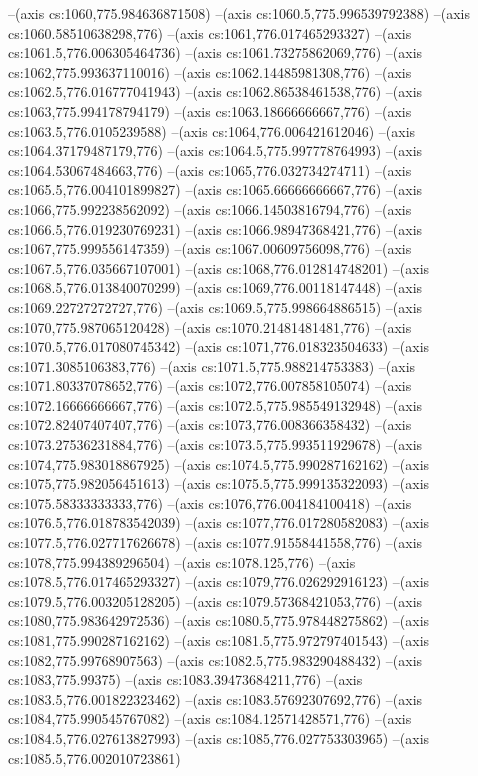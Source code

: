 --(axis cs:1060,775.984636871508)
--(axis cs:1060.5,775.996539792388)
--(axis cs:1060.58510638298,776)
--(axis cs:1061,776.017465293327)
--(axis cs:1061.5,776.006305464736)
--(axis cs:1061.73275862069,776)
--(axis cs:1062,775.993637110016)
--(axis cs:1062.14485981308,776)
--(axis cs:1062.5,776.016777041943)
--(axis cs:1062.86538461538,776)
--(axis cs:1063,775.994178794179)
--(axis cs:1063.18666666667,776)
--(axis cs:1063.5,776.0105239588)
--(axis cs:1064,776.006421612046)
--(axis cs:1064.37179487179,776)
--(axis cs:1064.5,775.997778764993)
--(axis cs:1064.53067484663,776)
--(axis cs:1065,776.032734274711)
--(axis cs:1065.5,776.004101899827)
--(axis cs:1065.66666666667,776)
--(axis cs:1066,775.992238562092)
--(axis cs:1066.14503816794,776)
--(axis cs:1066.5,776.019230769231)
--(axis cs:1066.98947368421,776)
--(axis cs:1067,775.999556147359)
--(axis cs:1067.00609756098,776)
--(axis cs:1067.5,776.035667107001)
--(axis cs:1068,776.012814748201)
--(axis cs:1068.5,776.013840070299)
--(axis cs:1069,776.00118147448)
--(axis cs:1069.22727272727,776)
--(axis cs:1069.5,775.998664886515)
--(axis cs:1070,775.987065120428)
--(axis cs:1070.21481481481,776)
--(axis cs:1070.5,776.017080745342)
--(axis cs:1071,776.018323504633)
--(axis cs:1071.3085106383,776)
--(axis cs:1071.5,775.988214753383)
--(axis cs:1071.80337078652,776)
--(axis cs:1072,776.007858105074)
--(axis cs:1072.16666666667,776)
--(axis cs:1072.5,775.985549132948)
--(axis cs:1072.82407407407,776)
--(axis cs:1073,776.008366358432)
--(axis cs:1073.27536231884,776)
--(axis cs:1073.5,775.993511929678)
--(axis cs:1074,775.983018867925)
--(axis cs:1074.5,775.990287162162)
--(axis cs:1075,775.982056451613)
--(axis cs:1075.5,775.999135322093)
--(axis cs:1075.58333333333,776)
--(axis cs:1076,776.004184100418)
--(axis cs:1076.5,776.018783542039)
--(axis cs:1077,776.017280582083)
--(axis cs:1077.5,776.027717626678)
--(axis cs:1077.91558441558,776)
--(axis cs:1078,775.994389296504)
--(axis cs:1078.125,776)
--(axis cs:1078.5,776.017465293327)
--(axis cs:1079,776.026292916123)
--(axis cs:1079.5,776.003205128205)
--(axis cs:1079.57368421053,776)
--(axis cs:1080,775.983642972536)
--(axis cs:1080.5,775.978448275862)
--(axis cs:1081,775.990287162162)
--(axis cs:1081.5,775.972797401543)
--(axis cs:1082,775.99768907563)
--(axis cs:1082.5,775.983290488432)
--(axis cs:1083,775.99375)
--(axis cs:1083.39473684211,776)
--(axis cs:1083.5,776.001822323462)
--(axis cs:1083.57692307692,776)
--(axis cs:1084,775.990545767082)
--(axis cs:1084.12571428571,776)
--(axis cs:1084.5,776.027613827993)
--(axis cs:1085,776.027753303965)
--(axis cs:1085.5,776.002010723861)
